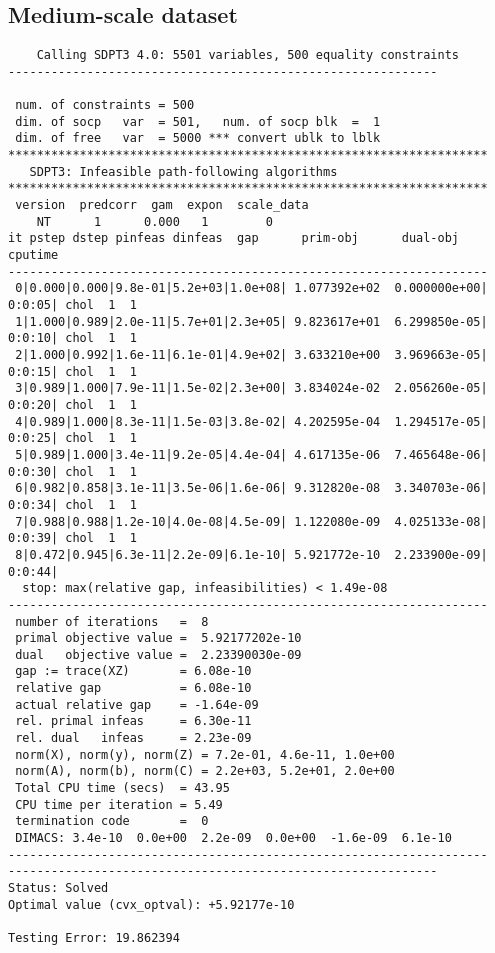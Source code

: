 \documentclass[11pt,a4paper]{report}
\begin{document}
\subsection{Medium-scale dataset}
\begin{verbatim}
    Calling SDPT3 4.0: 5501 variables, 500 equality constraints
------------------------------------------------------------

 num. of constraints = 500
 dim. of socp   var  = 501,   num. of socp blk  =  1
 dim. of free   var  = 5000 *** convert ublk to lblk
*******************************************************************
   SDPT3: Infeasible path-following algorithms
*******************************************************************
 version  predcorr  gam  expon  scale_data
    NT      1      0.000   1        0    
it pstep dstep pinfeas dinfeas  gap      prim-obj      dual-obj    cputime
-------------------------------------------------------------------
 0|0.000|0.000|9.8e-01|5.2e+03|1.0e+08| 1.077392e+02  0.000000e+00| 0:0:05| chol  1  1 
 1|1.000|0.989|2.0e-11|5.7e+01|2.3e+05| 9.823617e+01  6.299850e-05| 0:0:10| chol  1  1 
 2|1.000|0.992|1.6e-11|6.1e-01|4.9e+02| 3.633210e+00  3.969663e-05| 0:0:15| chol  1  1 
 3|0.989|1.000|7.9e-11|1.5e-02|2.3e+00| 3.834024e-02  2.056260e-05| 0:0:20| chol  1  1 
 4|0.989|1.000|8.3e-11|1.5e-03|3.8e-02| 4.202595e-04  1.294517e-05| 0:0:25| chol  1  1 
 5|0.989|1.000|3.4e-11|9.2e-05|4.4e-04| 4.617135e-06  7.465648e-06| 0:0:30| chol  1  1 
 6|0.982|0.858|3.1e-11|3.5e-06|1.6e-06| 9.312820e-08  3.340703e-06| 0:0:34| chol  1  1 
 7|0.988|0.988|1.2e-10|4.0e-08|4.5e-09| 1.122080e-09  4.025133e-08| 0:0:39| chol  1  1 
 8|0.472|0.945|6.3e-11|2.2e-09|6.1e-10| 5.921772e-10  2.233900e-09| 0:0:44|
  stop: max(relative gap, infeasibilities) < 1.49e-08
-------------------------------------------------------------------
 number of iterations   =  8
 primal objective value =  5.92177202e-10
 dual   objective value =  2.23390030e-09
 gap := trace(XZ)       = 6.08e-10
 relative gap           = 6.08e-10
 actual relative gap    = -1.64e-09
 rel. primal infeas     = 6.30e-11
 rel. dual   infeas     = 2.23e-09
 norm(X), norm(y), norm(Z) = 7.2e-01, 4.6e-11, 1.0e+00
 norm(A), norm(b), norm(C) = 2.2e+03, 5.2e+01, 2.0e+00
 Total CPU time (secs)  = 43.95  
 CPU time per iteration = 5.49  
 termination code       =  0
 DIMACS: 3.4e-10  0.0e+00  2.2e-09  0.0e+00  -1.6e-09  6.1e-10
-------------------------------------------------------------------
------------------------------------------------------------
Status: Solved
Optimal value (cvx_optval): +5.92177e-10

Testing Error: 19.862394
\end{verbatim}
\end{document}
